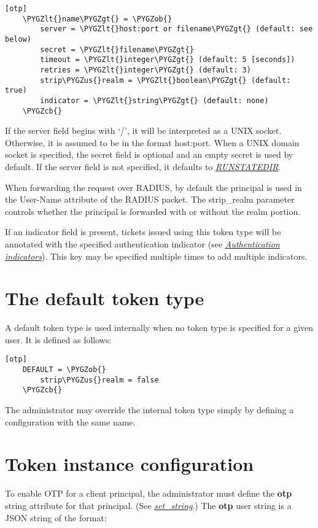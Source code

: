 \documentclass[letterpaper,10pt,english]{sphinxmanual}
\def\PYGZus{\char`\_}
\def\PYGZob{\char`\{}
\def\PYGZcb{\char`\}}
\def\PYGZlt{\char`\<}
\def\PYGZgt{\char`\>}
\begin{document}
\begin{Verbatim}[commandchars=\\\{\}]
[otp]
    \PYGZlt{}name\PYGZgt{} = \PYGZob{}
        server = \PYGZlt{}host:port or filename\PYGZgt{} (default: see below)
        secret = \PYGZlt{}filename\PYGZgt{}
        timeout = \PYGZlt{}integer\PYGZgt{} (default: 5 [seconds])
        retries = \PYGZlt{}integer\PYGZgt{} (default: 3)
        strip\PYGZus{}realm = \PYGZlt{}boolean\PYGZgt{} (default: true)
        indicator = \PYGZlt{}string\PYGZgt{} (default: none)
    \PYGZcb{}
\end{Verbatim}

If the server field begins with `/', it will be interpreted as a UNIX
socket.  Otherwise, it is assumed to be in the format host:port.  When
a UNIX domain socket is specified, the secret field is optional and an
empty secret is used by default.  If the server field is not
specified, it defaults to {\hyperref[mitK5defaults:paths]{\emph{RUNSTATEDIR}}}.

When forwarding the request over RADIUS, by default the principal is
used in the User-Name attribute of the RADIUS packet.  The strip\_realm
parameter controls whether the principal is forwarded with or without
the realm portion.

If an indicator field is present, tickets issued using this token type
will be annotated with the specified authentication indicator (see
{\hyperref[admin/auth_indicator:auth-indicator]{\emph{Authentication indicators}}}).  This key may be specified multiple times to
add multiple indicators.


\section{The default token type}
\label{admin/otp:the-default-token-type}
A default token type is used internally when no token type is specified for a
given user.  It is defined as follows:

\begin{Verbatim}[commandchars=\\\{\}]
[otp]
    DEFAULT = \PYGZob{}
        strip\PYGZus{}realm = false
    \PYGZcb{}
\end{Verbatim}

The administrator may override the internal  token type
simply by defining a configuration with the same name.


\section{Token instance configuration}
\label{admin/otp:token-instance-configuration}
To enable OTP for a client principal, the administrator must define
the \textbf{otp} string attribute for that principal.  (See
{\hyperref[admin/admin_commands/kadmin_local:set-string]{\emph{set\_string}}}.)  The \textbf{otp} user string is a JSON string of the
format:
\end{document}
